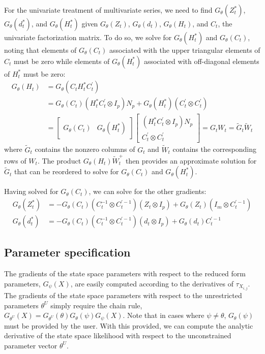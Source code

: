 \documentclass[12pt]{article}
\newcommand{\Gt}{G_\theta}
\begin{document}
	For the univariate treatment of multivariate series, we need to find $\Gt(Z_t^*)$, $\Gt(d_t^*)$, and $\Gt(H_t^*)$ given $\Gt(Z_t)$, $\Gt(d_t)$, $\Gt(H_t)$, and $C_t$, the univariate factorization matrix. To do so, we  solve for $\Gt(H_t^*)$ and $\Gt(C_t)$, noting that elements of $\Gt(C_t)$ associated with the upper triangular elements of $C_t$ must be zero while elements of $\Gt(H_t^*)$ associated with off-diagonal elements of $H_t^*$ must be zero: 
	\begin{align*}
	\Gt(H_t) &= \Gt(C_t H_t^* C_t^\prime) \\
	&= \Gt(C_t)(H_t^* C_t^\prime \otimes I_p) N_p + \Gt(H_t^*)(C_t^\prime \otimes C_t^\prime) \\
	&= \begin{bmatrix} \Gt(C_t) & \Gt(H_t^*) \end{bmatrix} \begin{bmatrix} (H_t^* C_t^\prime \otimes I_p) N_p \\ C_t^\prime \otimes C_t^\prime \end{bmatrix} 
	= G_t W_t
	= \tilde{G}_t \tilde{W}_t
	\end{align*}
	where $\tilde{G}_t$ contains the nonzero columns of $G_t$ and $\tilde{W}_t$ contains the corresponding rows of $W_t$. The product $\Gt(H_t) \tilde{W}_t^+$ then provides an approximate solution for $\tilde{G}_t$ that can be reordered to solve for $\Gt(C_t)$ and $\Gt(H_t^*)$.

	Having solved for $\Gt(C_t)$, we can solve for the other gradients: 
	\begin{align*} 
	\Gt(Z_t^*) &= -\Gt(C_t)(C_t^{-1} \otimes C_t^{\prime-1})(Z_t \otimes I_p) + \Gt(Z_t)(I_m \otimes C_t^{\prime-1}) \\
	\Gt(d_t^*) &= -\Gt(C_t)(C_t^{-1} \otimes C_t^{\prime-1})(d_t \otimes I_p) + \Gt(d_t)C_t^{\prime-1}
	\end{align*}

\subsection{Parameter specification}

	The gradients of the state space parameters with respect to the reduced form parameters, $G_\psi(X)$, are  easily computed according to the derivatives of $\tau_{X_{i,j}}$. The gradients of the state space parameters with respect to the unrestricted parameters $\theta^U$ simply require the chain rule, $G_{\theta^U}(X) = G_{\theta^U}(\theta) \Gt(\psi) G_\psi(X) $. Note that in cases where $\psi \neq \theta$, $\Gt(\psi)$ must be provided by the user. With this provided, we can compute the analytic derivative of the state space likelihood with respect to the unconstrained parameter vector $\theta^U$.


 

\end{document}
